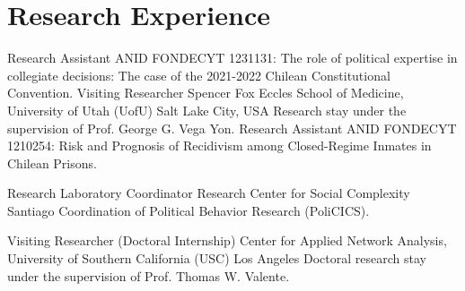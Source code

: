 \section{Research Experience}


        {Research Assistant}
        {ANID}
        {FONDECYT 1231131:}
        {The role of political expertise in collegiate decisions: The case of the 2021-2022 Chilean Constitutional Convention.}   %
        {}
        {Visiting Researcher}
        {Spencer Fox Eccles School of Medicine, University of Utah (UofU)}
        {Salt Lake City, USA}
        {\newline Research stay under the supervision of Prof. George G. Vega Yon.}   %
        {}
        {Research Assistant}
        {ANID}
        {FONDECYT 1210254:}
        {Risk and Prognosis of Recidivism among Closed-Regime Inmates in Chilean Prisons.}   %
        {}

        {Research Laboratory Coordinator}
        {Research Center for Social Complexity}
        {Santiago}
        {Coordination of Political Behavior Research (PoliCICS).}
        {}

        {Visiting Researcher (Doctoral Internship)}
        {Center for Applied Network Analysis, University of Southern California (USC)}
        {Los Angeles}
        {Doctoral research stay under the supervision of Prof. Thomas W. Valente.}
        {}